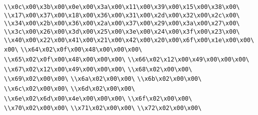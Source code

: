 \verb|\\x0c\x00\x3b\x00\x0e\x00\x3a\x00\x11\x00\x39\x00\x15\x00\x38\x00\|\newline
\verb|\\x17\x00\x37\x00\x18\x00\x36\x00\x31\x00\x2d\x00\x32\x00\x2c\x00\|\newline
\verb|\\x34\x00\x2b\x00\x36\x00\x2a\x00\x37\x00\x29\x00\x3a\x00\x27\x00\|\newline
\verb|\\x3c\x00\x26\x00\x3d\x00\x25\x00\x3e\x00\x24\x00\x3f\x00\x23\x00\|\newline
\verb|\\x40\x00\x22\x00\x41\x00\x21\x00\x42\x00\x20\x00\x6f\x00\x1e\x00\x00\x00\|\newline
\verb|\\x64\x02\x0f\x00\x48\x00\x00\x00\|\newline
\verb|\\x65\x02\x0f\x00\x48\x00\x00\x00\|\newline
\verb|\\x66\x02\x12\x00\x49\x00\x00\x00\|\newline
\verb|\\x67\x02\x12\x00\x49\x00\x00\x00\|\newline
\verb|\\x68\x02\x00\x00\|\newline
\verb|\\x69\x02\x00\x00\|\newline
\verb|\\x6a\x02\x00\x00\|\newline
\verb|\\x6b\x02\x00\x00\|\newline
\verb|\\x6c\x02\x00\x00\|\newline
\verb|\\x6d\x02\x00\x00\|\newline
\verb|\\x6e\x02\x6d\x00\x4e\x00\x00\x00\|\newline
\verb|\\x6f\x02\x00\x00\|\newline
\verb|\\x70\x02\x00\x00\|\newline
\verb|\\x71\x02\x00\x00\|\newline
\verb|\\x72\x02\x00\x00\|\newline
